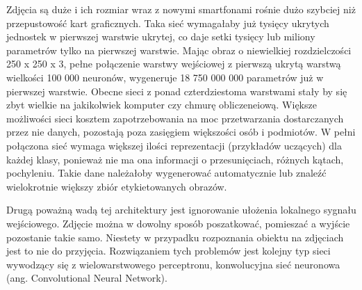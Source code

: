 \documentclass[12pt,a4paper,twoside,titlepage,openright]{book}
\begin{document}
Zdjęcia są duże i ich rozmiar wraz z nowymi smartfonami rośnie dużo szybciej niż przepustowość kart graficznych. Taka sieć wymagałaby już tysięcy ukrytych jednostek w pierwszej warstwie ukrytej, co daje setki tysięcy lub miliony parametrów tylko na pierwszej warstwie. Mając obraz o niewielkiej rozdzielczości 250 x 250 x 3, pełne połączenie warstwy wejściowej z pierwszą ukrytą warstwą wielkości 100 000 neuronów, wygeneruje 18 750 000 000 parametrów już w pierwszej warstwie. Obecne sieci z ponad czterdziestoma warstwami stały by się zbyt wielkie na jakikolwiek komputer czy chmurę obliczeneiową. Większe możliwości sieci kosztem zapotrzebowania na moc przetwarzania dostarczanych przez nie danych, pozostają poza zasięgiem większości osób i podmiotów. W pełni połączona sieć wymaga większej ilości reprezentacji (przykładów uczących) dla każdej klasy, ponieważ nie ma ona informacji o przesunięciach, różnych kątach, pochyleniu. Takie dane należałoby wygenerować automatycznie lub znaleźć wielokrotnie większy zbiór etykietowanych obrazów.

Drugą poważną wadą tej architektury jest ignorowanie ułożenia lokalnego sygnału wejściowego. Zdjęcie można w dowolny sposób poszatkować, pomieszać a wyjście pozostanie takie samo. Niestety w przypadku rozpoznania obiektu na zdjęciach jest to nie do przyjęcia. Rozwiązaniem tych problemów jest kolejny typ sieci wywodzący się z wielowarstwowego perceptronu, konwolucyjna sieć neuronowa  (ang. Convolutional Neural Network).
\end{document}
